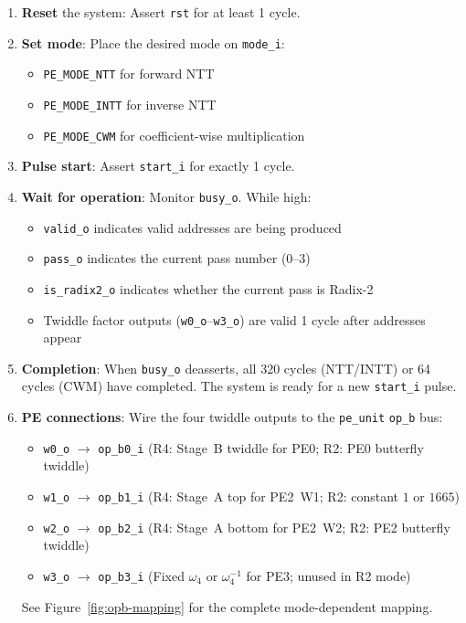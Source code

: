 \documentclass[11pt,a4paper]{article}
\newcommand{\sv}[1]{\texttt{#1}}
\newcommand{\port}[1]{\texttt{#1}}
\begin{document}
\begin{enumerate}[label=\textbf{\arabic*.}]
  \item \textbf{Reset} the system: Assert \port{rst} for at least 1 cycle.

  \item \textbf{Set mode}: Place the desired mode on \port{mode\_i}:
    \begin{itemize}
      \item \sv{PE\_MODE\_NTT} for forward NTT
      \item \sv{PE\_MODE\_INTT} for inverse NTT
      \item \sv{PE\_MODE\_CWM} for coefficient-wise multiplication
    \end{itemize}

  \item \textbf{Pulse start}: Assert \port{start\_i} for exactly 1 cycle.

  \item \textbf{Wait for operation}: Monitor \port{busy\_o}. While high:
    \begin{itemize}
      \item \port{valid\_o} indicates valid addresses are being produced
      \item \port{pass\_o} indicates the current pass number (0--3)
      \item \port{is\_radix2\_o} indicates whether the current pass is Radix-2
      \item Twiddle factor outputs (\port{w0\_o}--\port{w3\_o}) are valid 1 cycle after addresses appear
    \end{itemize}

  \item \textbf{Completion}: When \port{busy\_o} deasserts, all 320 cycles (NTT/INTT) or 64 cycles (CWM) have completed. The system is ready for a new \port{start\_i} pulse.

  \item \textbf{PE connections}: Wire the four twiddle outputs to the \sv{pe\_unit} \port{op\_b} bus:
    \begin{itemize}
      \item \port{w0\_o} $\to$ \port{op\_b0\_i} \;
            (R4: Stage~B twiddle for PE0; R2: PE0 butterfly twiddle)
      \item \port{w1\_o} $\to$ \port{op\_b1\_i} \;
            (R4: Stage~A top for PE2~W1; R2: constant $1$ or $1665$)
      \item \port{w2\_o} $\to$ \port{op\_b2\_i} \;
            (R4: Stage~A bottom for PE2~W2; R2: PE2 butterfly twiddle)
      \item \port{w3\_o} $\to$ \port{op\_b3\_i} \;
            (Fixed $\omega_4$ or $\omega_4^{-1}$ for PE3; unused in R2 mode)
    \end{itemize}
    See Figure~\ref{fig:opb-mapping} for the complete mode-dependent mapping.
\end{enumerate}
\end{document}
